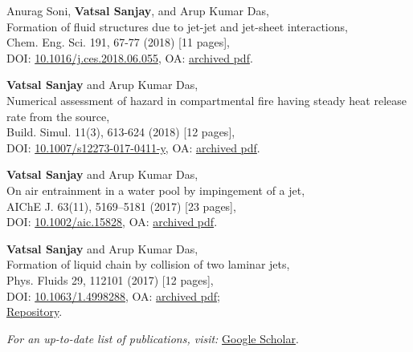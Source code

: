 \documentclass[10pt,a4paper,colorlinks,linkcolor=blue,urlcolor=blue,citecolor=blue]{moderncv}
\begin{document}
\begin{enumerate}[leftmargin=1.5em,label=\textbf{[\arabic*]}]
	\item Anurag Soni, \textbf{Vatsal Sanjay}, and Arup Kumar Das,\\
	Formation of fluid structures due to jet-jet and jet-sheet interactions,\\
	Chem. Eng. Sci. 191, 67-77 (2018) [11 pages],\\
	\faLock\hspace{0.2em}DOI: \href{https://doi.org/10.1016/j.ces.2018.06.055}{10.1016/j.ces.2018.06.055}, \faFile\hspace{0.2em}OA: \href{https://tinyurl.com/2bv5fznd}{archived pdf}.

	\item \textbf{Vatsal Sanjay} and Arup Kumar Das,\\
	Numerical assessment of hazard in compartmental fire having steady heat release rate from the source,\\
	Build. Simul. 11(3), 613-624 (2018) [12 pages],\\
	\faLock\hspace{0.2em}DOI: \href{https://doi.org/10.1007/s12273-017-0411-y}{10.1007/s12273-017-0411-y}, \faFile\hspace{0.2em}OA: \href{https://tinyurl.com/2bwhzlzv}{archived pdf}.

	\item \textbf{Vatsal Sanjay} and Arup Kumar Das,\\
	On air entrainment in a water pool by impingement of a jet,\\
	AIChE J. 63(11), 5169--5181 (2017) [23 pages],\\
	\faLock\hspace{0.2em}DOI: \href{https://doi.org/10.1002/aic.15828}{10.1002/aic.15828}, \faFile\hspace{0.2em}OA: \href{https://tinyurl.com/24ne4oql}{archived pdf}.

	\item \textbf{Vatsal Sanjay} and Arup Kumar Das,\\
	Formation of liquid chain by collision of two laminar jets,\\
	Phys. Fluids 29, 112101 (2017) [12 pages],\\
	\faLock\hspace{0.2em}DOI: \href{https://doi.org/10.1063/1.4998288}{10.1063/1.4998288}, \faFile\hspace{0.2em}OA: \href{https://tinyurl.com/27sd7lgo}{archived pdf};\\
	\faGithub\hspace{0.2em}\href{https://github.com/VatsalSy/FluidChains}{Repository}.

\end{enumerate}

\vspace{1em}
\textit{For an up-to-date list of publications, visit:} \href{https://scholar.google.com/citations?hl=en&user=tHb_qZoAAAAJ}{Google Scholar}.
\end{document}
